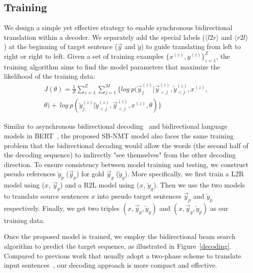 \documentclass[11pt,a4paper]{article}
\begin{document}
\begin{CJK*}{UTF8}{gbsn}
\subsection{Training} \label{Training-sec}
We design a simple yet effective strategy to enable synchronous bidirectional translation within a decoder. 
We separately add the special labels ($\langle l2r \rangle$ and $\langle r2l \rangle$) at the beginning of target sentence ($\overrightarrow{y}$ and $\overleftarrow{y}$) to guide translating from left to right or right to left.
Given a set of training examples $\{x^{(z)}, y^{(z)}\}^Z_{z=1}$, the training algorithm aims to find the model parameters that maximize the likelihood of the training data:
\begin{equation}
\begin{aligned}
J(\theta) = \frac{1}{Z} \sum_{z=1}^Z \sum_{j=1}^M \{ log \ p(\overrightarrow{y}^{(z)}_{j}|\overrightarrow{y}^{(z)}_{<j},\overleftarrow{y}^{(z)}_{<j},x^{(z)},\\ \theta) 
+ \ log \ p(\overleftarrow{y}^{(z)}_{j}|\overleftarrow{y}^{(z)}_{<j}, \overrightarrow{y}^{(z)}_{<j}, x^{(z)},\theta)\}
\end{aligned}
\end{equation}

Similar to asynchronous bidirectional decoding~\cite{zhang2018asynchronous} and bidirectional language models in BERT~\cite{devlin2018bert}, the proposed SB-NMT model also faces the same training problem that the bidirectional decoding would allow the words (the second half of the decoding sequence) to indirectly "see themselves" from the other decoding direction.
To ensure consistency between model training and testing, we construct pseudo references $\overleftarrow{y}_{p}$ ($\overrightarrow{y}_{p}$) for gold $\overrightarrow{y}_{g}$ ($\overleftarrow{y}_{g}$).
More specifically, we first train a L2R model using ($x$, $\overrightarrow{y}_{g}$) and a R2L model using ($x$, $\overleftarrow{y}_{g}$). Then we use the two models to translate source sentences $x$ into pseudo target sentences $\overrightarrow{y}_{p}$ and $\overleftarrow{y}_{p}$ respectively.
Finally, we get two triples $(x, \overrightarrow{y}_{p}, \overleftarrow{y}_{g})$  and $(x, \overrightarrow{y}_{g}, \overleftarrow{y}_{p})$ as our training data.

Once the proposed model is trained, we employ the bidirectional beam search algorithm to predict the target sequence, as illustrated in Figure~\ref{decoding}.
Compared to previous work that usually adopt a two-phase scheme to translate input sentences~\cite{liu2016agreementa,sennrich2017university,zhang2018asynchronous}, our decoding approach is more compact and effective.




\end{CJK*}
\end{document}
